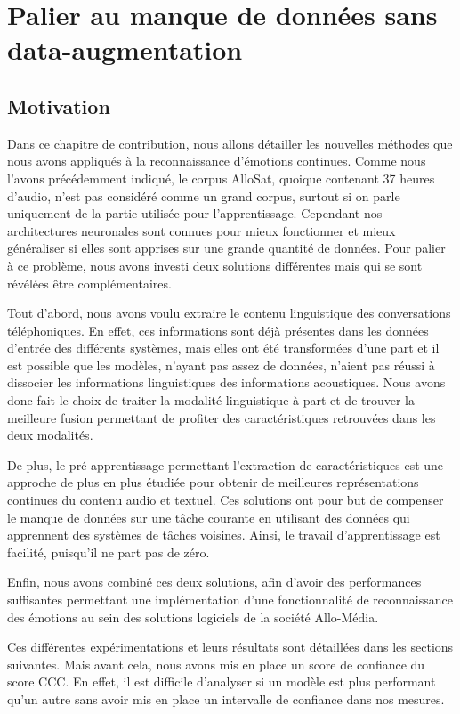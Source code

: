 \chapter{Palier au manque de données sans data-augmentation}
\label{chapitre6}

\section{Motivation}

Dans ce chapitre de contribution, nous allons détailler les nouvelles méthodes que nous avons appliqués à la reconnaissance d'émotions continues. Comme nous l'avons précédemment indiqué, le corpus AlloSat, quoique contenant 37 heures d'audio, n'est pas considéré comme un grand corpus, surtout si on parle uniquement de la partie utilisée pour l'apprentissage. Cependant nos architectures neuronales sont connues pour mieux fonctionner et mieux généraliser si elles sont apprises sur une grande quantité de données. Pour palier à ce problème, nous avons investi deux solutions différentes mais qui se sont révélées être complémentaires.

Tout d'abord, nous avons voulu extraire le contenu linguistique des conversations téléphoniques. En effet, ces informations sont déjà présentes dans les données d'entrée des différents systèmes, mais elles ont été transformées d'une part et il est possible que les modèles, n'ayant pas assez de données, n'aient pas réussi à dissocier les informations linguistiques des informations acoustiques. Nous avons donc fait le choix de traiter la modalité linguistique à part et de trouver la meilleure fusion permettant de profiter des caractéristiques retrouvées dans les deux modalités.

De plus, le pré-apprentissage permettant l'extraction de caractéristiques est une approche de plus en plus étudiée pour obtenir de meilleures représentations continues du contenu audio et textuel. Ces solutions ont pour but de compenser le manque de données sur une tâche courante en utilisant des données qui apprennent des systèmes de tâches voisines. Ainsi, le travail d'apprentissage est facilité, puisqu'il ne part pas de zéro.

Enfin, nous avons combiné ces deux solutions, afin d'avoir des performances suffisantes permettant une implémentation d'une fonctionnalité de reconnaissance des émotions au sein des solutions logiciels de la société Allo-Média.

Ces différentes expérimentations et leurs résultats sont détaillées dans les sections suivantes. Mais avant cela, nous avons mis en place un score de confiance du score CCC. En effet, il est difficile d'analyser si un modèle est plus performant qu'un autre sans avoir mis en place un intervalle de confiance dans nos mesures.

